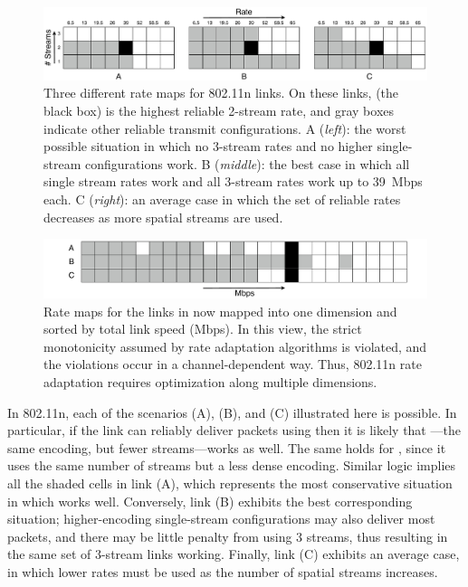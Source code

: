 \begin{figure}[t]
      \centering
      \includegraphics[width=\textwidth]{figures/rate_table_2d.pdf}
      \caption[Three different rate maps for 802.11n links]{\label{fig:rate_table_2d}Three different rate maps for 802.11n links. On these links,  (the black box) is the highest reliable 2-stream rate, and gray boxes indicate other reliable transmit configurations. A (\emph{left}): the worst possible situation in which no 3-stream rates and no higher single-stream configurations work. B (\emph{middle}): the best case in which all single stream rates work and all 3-stream rates work up to 39~Mbps each. C (\emph{right}): an average case in which the set of reliable rates decreases as more spatial streams are used.}
\end{figure}
\begin{figure}[t]
      \centering
      \includegraphics[width=\textwidth]{figures/rate_table_1d.pdf}
      \caption[Rate maps for the links in  mapped into one dimension]{\label{fig:rate_table_1d}Rate maps for the links in  now mapped into one dimension and sorted by total link speed (Mbps).
      In this view, the strict monotonicity assumed by rate adaptation algorithms is violated, and the violations occur in a channel-dependent way. Thus, 802.11n rate adaptation requires optimization along multiple dimensions.}
\end{figure}

In 802.11n, each of the scenarios (A), (B), and (C) illustrated here is possible. In particular, if the link can reliably deliver packets using  then it is likely that ---the same encoding, but fewer streams---works as well. The same holds for , since it uses the same number of streams but a less dense encoding. Similar logic implies all the shaded cells in link (A), which represents the most conservative situation in which  works well. Conversely, link (B) exhibits the best corresponding situation; higher-encoding single-stream configurations may also deliver most packets, and there may be little penalty from using 3 streams, thus resulting in the same set of 3-stream links working. Finally, link (C) exhibits an average case, in which lower rates must be used as the number of spatial streams increases.

